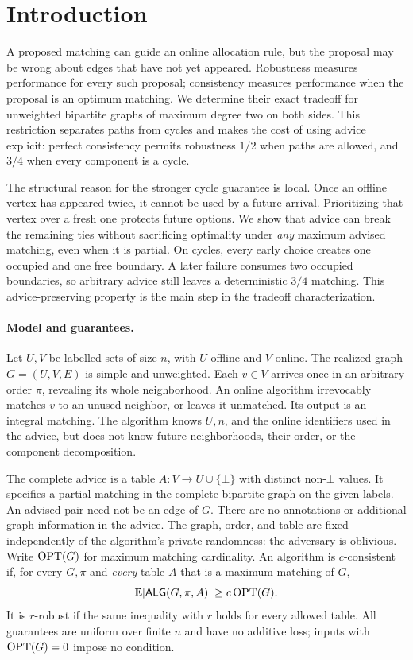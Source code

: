\section{Introduction}

A proposed matching can guide an online allocation rule, but the proposal may
be wrong about edges that have not yet appeared. Robustness measures performance
for every such proposal; consistency measures performance when the proposal is
an optimum matching. We determine their exact tradeoff for unweighted bipartite
graphs of maximum degree two on both sides. This restriction separates paths
from cycles and makes the cost of using advice explicit: perfect consistency
permits robustness $1/2$ when paths are allowed, and $3/4$ when every component
is a cycle.

The structural reason for the stronger cycle guarantee is local. Once an
offline vertex has appeared twice, it cannot be used by a future arrival.
Prioritizing that vertex over a fresh one protects future options. We show that
advice can break the remaining ties without sacrificing optimality under
\emph{any} maximum advised matching, even when it is partial. On cycles, every
early choice creates one occupied and one free boundary. A later failure
consumes two occupied boundaries, so arbitrary advice still leaves a
deterministic $3/4$ matching. This advice-preserving property is the main step
in the tradeoff characterization.

\paragraph{Model and guarantees.}
Let $U,V$ be labelled sets of size $n$, with $U$ offline and $V$ online.
The realized graph $G=(U,V,E)$ is simple and unweighted. Each $v\in V$ arrives
once in an arbitrary order $\pi$, revealing its whole neighborhood. An online
algorithm irrevocably matches $v$ to an unused neighbor, or leaves it unmatched.
Its output is an integral matching. The algorithm knows $U,n$, and the online
identifiers used in the advice, but does not know future neighborhoods, their
order, or the component decomposition.

The complete advice is a table $A:V\to U\cup\{\bot\}$ with distinct
non-$\bot$ values. It specifies a partial matching in the complete bipartite
graph on the given labels. An advised pair need not be an edge of $G$.
There are no annotations or additional graph information in the advice.
The graph, order, and table are fixed independently of the algorithm's private
randomness: the adversary is oblivious. Write $\operatorname{OPT}(G)$ for maximum matching
cardinality. An algorithm is $c$-consistent if, for every $G,\pi$ and
\emph{every} table $A$ that is a maximum matching of $G$,
\[
  \mathbb E|\mathsf{ALG}(G,\pi,A)|\ge c\operatorname{OPT}(G).
\]
It is $r$-robust if the same inequality with $r$ holds for every allowed table.
All guarantees are uniform over finite $n$ and have no additive loss; inputs
with $\operatorname{OPT}(G)=0$ impose no condition.

